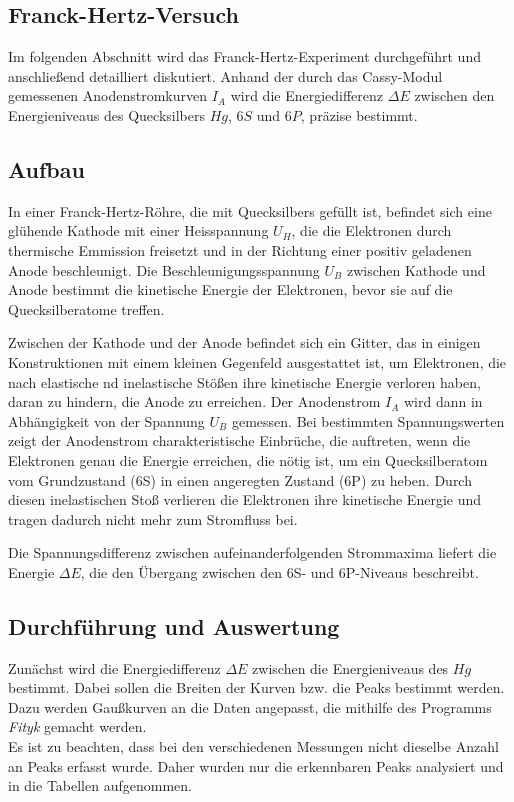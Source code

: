 \documentclass{article}
\begin{document}
\begin{multicols}{2}
\clearpage
\section{Franck-Hertz-Versuch}
Im folgenden Abschnitt wird das Franck-Hertz-Experiment durchgeführt und anschließend detailliert 
diskutiert. Anhand der durch das Cassy-Modul gemessenen Anodenstromkurven \( I_A \) wird die 
Energiedifferenz \( \Delta E \) zwischen den Energieniveaus des Quecksilbers $Hg$, \( 6S \) und \( 6P \), 
präzise bestimmt.
\subsection{Aufbau}
In einer Franck-Hertz-Röhre, die mit Quecksilbers gefüllt ist, befindet sich eine glühende 
Kathode mit einer Heisspannung $U_H$, die die Elektronen durch thermische Emmission freisetzt und in der 
Richtung einer positiv geladenen Anode beschleunigt. Die Beschleunigungsspannung $U_B$ zwischen Kathode 
und Anode bestimmt die kinetische Energie der Elektronen, bevor sie auf die Quecksilberatome treffen.

Zwischen der Kathode und der Anode befindet sich ein Gitter, das in einigen Konstruktionen mit einem kleinen 
Gegenfeld ausgestattet ist, um Elektronen, die nach elastische nd inelastische Stößen ihre kinetische Energie 
verloren haben, daran zu hindern, die Anode zu erreichen. Der Anodenstrom $I_A$
wird dann in Abhängigkeit von der Spannung $U_B$ gemessen. Bei bestimmten Spannungswerten zeigt der Anodenstrom charakteristische Einbrüche, die auftreten, wenn die Elektronen genau die Energie erreichen, die nötig ist, um ein Quecksilberatom vom Grundzustand (6S) in einen angeregten Zustand (6P) zu heben.
 Durch diesen inelastischen Stoß verlieren die Elektronen ihre kinetische Energie und tragen dadurch nicht mehr zum Stromfluss bei.

Die Spannungsdifferenz zwischen aufeinanderfolgenden Strommaxima liefert die Energie $\Delta E$, die den 
Übergang zwischen den 6S- und 6P-Niveaus beschreibt. 
\subsection{Durchführung und Auswertung}
Zunächst wird die Energiedifferenz $\Delta E$ zwischen die Energieniveaus des $Hg$ bestimmt. 
Dabei sollen die Breiten der Kurven bzw. die Peaks bestimmt werden. Dazu werden Gaußkurven an die Daten angepasst,
die mithilfe des Programms \textit{Fityk} gemacht werden.
\\ Es ist zu beachten, dass bei den verschiedenen Messungen nicht dieselbe Anzahl an Peaks 
erfasst wurde. Daher wurden nur die erkennbaren Peaks analysiert und in die Tabellen 
aufgenommen. 

\end{multicols}
\end{document}
